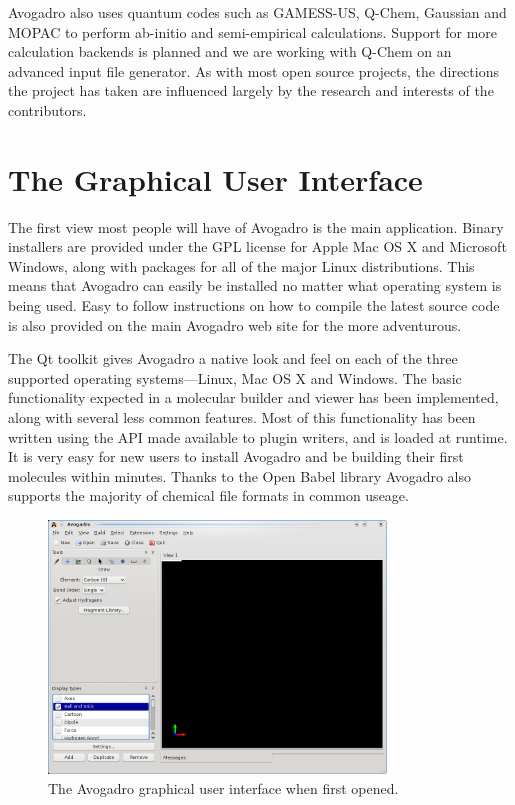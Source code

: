\documentclass{article}
\begin{document}
Avogadro also uses quantum codes such as GAMESS-US, Q-Chem, Gaussian and MOPAC to perform ab-initio and semi-empirical calculations. Support for more calculation backends is planned and we are working with Q-Chem on an advanced input file generator. As with most open source projects, the directions the project has taken are influenced largely by the research and interests of the contributors.

\section{The Graphical User Interface}

The first view most people will have of Avogadro is the main application. Binary installers are provided under the GPL license for Apple Mac OS X and Microsoft Windows, along with packages for all of the major Linux distributions. This means that Avogadro can easily be installed no matter what operating system is being used. Easy to follow instructions on how to compile the latest source code is also provided on the main Avogadro web site for the more adventurous.

The Qt toolkit gives Avogadro a native look and feel on each of the three supported operating systems---Linux, Mac OS X and Windows. The basic functionality expected in a molecular builder and viewer has been implemented, along with several less common features. Most of this functionality has been written using the API made available to plugin writers, and is loaded at runtime. It is very easy for new users to install Avogadro and be building their first molecules within minutes. Thanks to the Open Babel library Avogadro also supports the majority of chemical file formats in common useage.

\begin{figure}
	\includegraphics[width=0.8\textwidth]{images/avogadro-0-9-3}
	\caption{The Avogadro graphical user interface when first opened.}
	\label{f:avogadrogui}
\end{figure}
\end{document}
